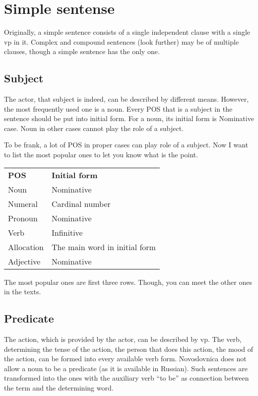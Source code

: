 \section{Simple sentense}

Originally, a simple sentence consists of a single independent clause with a single \gls{vp} in it. Complex and compound sentences (look further) may be of multiple clauses, though a simple sentence has the only one.

\subsection{Subject}

The actor, that subject is indeed, can be described by different means. However, the most frequently used one is a noun.  Every POS that is a subject in the sentence should be put into initial form. For a noun, its initial form is Nominative case. Noun in other cases cannot play the role of a subject.

To be frank, a lot of POS in proper cases can play role of a subject. Now I want to list the most popular ones to let you know what is the point.

\begin{table}[h]
	\begin{tabular}{ll}
		\textbf{POS} & \textbf{Initial form} \\
		Noun & Nominative \\
		Numeral & Cardinal number \\
		Pronoun & Nominative \\
		Verb & Infinitive \\
		Allocation & The main word in initial form \\
		Adjective & Nominative \\
	\end{tabular}
\end{table}

The most popular ones are first three rows. Though, you can meet the other ones in the texts.

\subsection{Predicate}

The action, which is provided by the actor, can be described by \gls{vp}. The verb, determining the tense of the action, the person that does this action, the mood of the action, can be formed into every available verb form. Novoslovnica does not allow a noun to be a predicate (as it is available in Russian). Such sentences are transformed into the ones with the auxiliary verb “to be” as connection between the term and the determining word.

